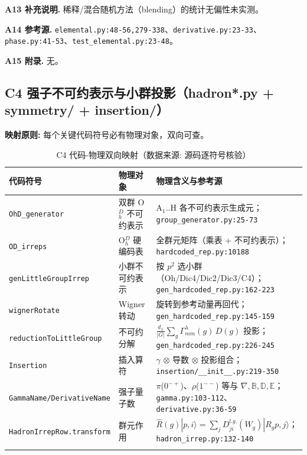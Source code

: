 \documentclass[UTF8]{ctexart}
\begin{document}
\textbf{A13 补充说明.} 稀释/混合随机方法（blending）的统计无偏性未实测。

\textbf{A14 参考源.} \texttt{\nolinkurl{elemental.py:48-56,279-338}}、\texttt{\nolinkurl{derivative.py:23-33}}、
\texttt{\nolinkurl{phase.py:41-53}}、\texttt{\nolinkurl{test_elemental.py:23-48}}。

\textbf{A15 附录.} 无。

\subsection{C4 强子不可约表示与小群投影（hadron*.py + symmetry/ + insertion/）}

\begin{mapbox}
\textbf{映射原则:} 每个关键代码符号必有物理对象，双向可查。
\end{mapbox}

{\footnotesize\begin{xltabular}{\textwidth}{XlX}
\toprule
\textcolor{map}{代码符号} & 物理对象 & 物理含义与参考源 \\
\midrule
\endhead
\texttt{\nolinkurl{OhD_generator}} & 双群 O$_h^D$ 不可约表示 & A$_1$..H 各不可约表示生成元；\texttt{\nolinkurl{group_generator.py:25-73}} \\
\texttt{\nolinkurl{OD_irreps}} & O$_h^D$ 硬编码表 & 全群元矩阵（乘表 + 不可约表示）；\texttt{\nolinkurl{hardcoded_rep.py:10188}} \\
\texttt{genLittleGroupIrrep} & 小群不可约表示 & 按 $p^2$ 选小群（Oh/Dic4/Dic2/Dic3/C4）；\texttt{\nolinkurl{gen_hardcoded_rep.py:162-223}} \\
\texttt{wignerRotate} & Wigner 转动 & 旋转到参考动量再回代；\texttt{\nolinkurl{gen_hardcoded_rep.py:145-159}} \\
\texttt{reductionToLittleGroup} & 不可约分解 & $\frac{d_\lambda}{|G|}\sum_g \Gamma^\lambda_{mm}(g)\,D(g)$ 投影；\texttt{\nolinkurl{gen_hardcoded_rep.py:226-245}} \\
\texttt{Insertion} & 插入算符 & $\gamma$ $\otimes$ 导数 $\otimes$ 投影组合；\texttt{\nolinkurl{insertion/__init__.py:219-350}} \\
\texttt{\nolinkurl{GammaName/DerivativeName}} & 强子量子数 & $\pi$($0^{-+}$)、$\rho$($1^{--}$) 等与 $\nabla,\mathbb{B},\mathbb{D},\mathbb{E}$；\texttt{\nolinkurl{gamma.py:103-112}}、\texttt{\nolinkurl{derivative.py:36-59}} \\
\texttt{\nolinkurl{HadronIrrepRow.transform}} & 群元作用 & $\hat R(g)|p,i\rangle=\sum_j D^{l.g.}_{ji}(W_g)|R_g p,j\rangle$；\texttt{\nolinkurl{hadron_irrep.py:132-140}} \\
\bottomrule
\caption{C4 代码-物理双向映射（数据来源: 源码逐符号核验）}
\end{xltabular}}
\end{document}
